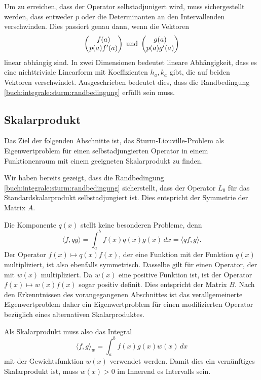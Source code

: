 Um zu erreichen, dass der Operator selbstadjunigert wird, muss 
sichergestellt werden, dass entweder $p$ oder die Determinanten
an den Intervallenden verschwinden.
Dies passiert genau dann, wenn die Vektoren 
\[
\begin{pmatrix}
f(a)\\
p(a)f'(a)
\end{pmatrix}
\text{\;und\;}
\begin{pmatrix}
g(a)\\
p(a)g'(a)
\end{pmatrix}
\]
linear abhängig sind.
In zwei Dimensionen bedeutet lineare Abhängigkeit, dass es
eine nichttriviale Linearform mit Koeffizienten $h_a, k_a$ gibt,
die auf beiden Vektoren verschwindet.
Ausgeschrieben bedeutet dies, dass die Randbedingung
\eqref{buch:integrale:sturm:randbedingung}
erfüllt sein muss.

%
%
\subsection{Skalarprodukt}
Das Ziel der folgenden Abschnitte ist, das Sturm-Liouville-Problem als
Eigenwertproblem für einen selbstadjungierten Operator in einem 
Funktionenraum mit einem geeigneten Skalarprodukt zu finden.

Wir haben bereits gezeigt, dass die Randbedingung
\eqref{buch:integrale:sturm:randbedingung} sicherstellt, dass der
Operator $L_0$ für das Standardskalarprodukt selbstadjungiert ist.
Dies entspricht der Symmetrie der Matrix $A$.

Die Komponente $q(x)$ stellt keine besonderen Probleme, denn
\[
\langle f,qg\rangle
=
\int_a^b f(x)q(x)g(x)\,dx
=
\langle qf,g\rangle.
\]
Der Operator $f(x) \mapsto q(x)f(x)$, der eine Funktion mit 
der Funktion $q(x)$ multipliziert, ist also ebenfalls symmetrisch.
Dasselbe gilt für einen Operator, der mit $w(x)$ multipliziert.
Da $w(x)$ eine positive Funktion ist, ist der Operator $f(x)\mapsto w(x)f(x)$
sogar positiv definit.
Dies entspricht der Matrix $B$.
Nach den Erkenntnissen des vorangegangenen Abschnittes ist das
verallgemeinerte Eigenwertproblem daher ein Eigenwertproblem
für einen modifizierten Operator bezüglich eines alternativen
Skalarproduktes.

Als Skalarprodukt muss also das Integral
\[
\langle f,g\rangle_w
=
\int_a^b f(x)g(x)w(x)\,dx
\]
mit der Gewichtsfunktion $w(x)$ verwendet werden.
Damit dies ein vernünftiges Skalarprodukt ist, muss $w(x)>0$ im
Innerend es Intervalls sein.

